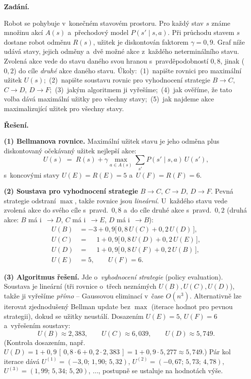 \begin{priklad}
\par
\textbf{Zadání.}\par
Robot se pohybuje v~konečném stavovém prostoru. Pro každý stav $s$ známe množinu akcí $A(s)$ a~přechodový model $P(s'\mid s,a)$. Při průchodu stavem $s$ dostane robot odměnu $R(s)$, užitek je diskontován faktorem $\gamma=0{,}9$. Graf níže udává stavy, jejich odměny a~dvě možné akce z~každého neterminálního stavu. Zvolená akce vede do stavu daného svou hranou s~pravděpodobností $0{,}8$, jinak ($0{,}2$) do cíle \emph{druhé} akce daného stavu. Úkoly: \,(1)~napište rovnici pro maximální užitek $U(s)$;\, (2)~napište soustavu rovnic pro vyhodnocení strategie $B\to C$, $C\to D$, $D\to F$;\, (3)~jakým algoritmem ji vyřešíme;\, (4)~jak ověříme, že tato volba dává maximální užitky pro všechny stavy;\, (5)~jak najdeme akce maximalizující užitek pro všechny stavy.

\medskip
\textbf{Řešení.}

\textbf{(1) Bellmanova rovnice.} Maximální užitek stavu je jeho odměna plus diskontovaný očekávaný užitek nejlepší akce:
\[
  U(s) \;=\; R(s) + \gamma \max_{a\in A(s)} \sum_{s'} P(s'\mid s,a)\,U(s'),
\]
s~koncovými stavy $U(E)=R(E)=5$ a~$U(F)=R(F)=6$.

\textbf{(2) Soustava pro vyhodnocení strategie} $B\to C,\,C\to D,\,D\to F$. Pevná strategie odstraní $\max$, takže rovnice jsou \emph{lineární}. U~každého stavu vede zvolená akce do svého cíle s~pravd.\ $0{,}8$ a~do cíle druhé akce s~pravd.\ $0{,}2$ (druhá akce: $B$ má i~$\to D$, $C$ má i~$\to E$, $D$ má i~$\to B$):
\[
\begin{aligned}
  U(B) &= -3 + 0{,}9\big[\,0{,}8\,U(C) + 0{,}2\,U(D)\,\big],\\
  U(C) &= \phantom{-}1 + 0{,}9\big[\,0{,}8\,U(D) + 0{,}2\,U(E)\,\big],\\
  U(D) &= \phantom{-}1 + 0{,}9\big[\,0{,}8\,U(F) + 0{,}2\,U(B)\,\big],\\
  U(E) &= 5,\qquad U(F)=6.
\end{aligned}
\]

\textbf{(3) Algoritmus řešení.} Jde o~\emph{vyhodnocení strategie} (policy evaluation). Soustava je lineární (tři rovnice o~třech neznámých $U(B),U(C),U(D)$), takže ji vyřešíme \emph{přímo} -- Gaussovou eliminací v~čase $O(n^3)$. Alternativně lze iterovat zjednodušený Bellman update bez $\max$ (iterace hodnot pro pevnou strategii), dokud se užitky neustálí. Dosazením $U(E)=5$, $U(F)=6$ a~vyřešením soustavy:
\[
  \boxed{U(B) \approx 2{,}383,\qquad U(C) \approx 6{,}039,\qquad U(D) \approx 5{,}749.}
\]
(Kontrola dosazením, např.\ $U(D)=1+0{,}9\,[\,0{,}8\cdot 6 + 0{,}2\cdot 2{,}383\,]=1+0{,}9\cdot 5{,}277\approx 5{,}749$.) Pár kol iterace dává $U^{(1)}=(-3{,}0;\,1{,}90;\,5{,}32)$, $U^{(2)}=(-0{,}67;\,5{,}73;\,4{,}78)$, $U^{(3)}=(1{,}99;\,5{,}34;\,5{,}20)$, $\dots$, postupně se ustaluje na hodnotách výše.


\end{priklad}
